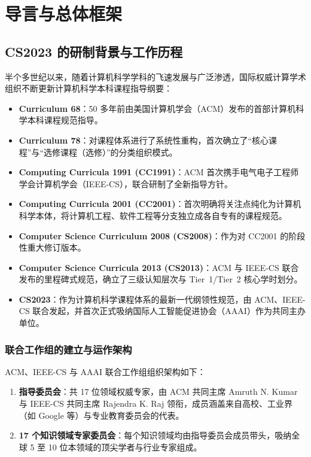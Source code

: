 \chapter{导言与总体框架}

\section{CS2023 的研制背景与工作历程}

\begin{preamblebox}[历史沿革与演进]
半个多世纪以来，随着计算机科学学科的飞速发展与广泛渗透，国际权威计算学术组织不断更新计算机科学本科课程指导纲要：
\begin{itemize}
    \item \textbf{Curriculum 68}：50 多年前由美国计算机学会（ACM）发布的首部计算机科学本科课程规范指导。
    \item \textbf{Curriculum 78}：对课程体系进行了系统性重构，首次确立了“核心课程”与“选修课程（选修）”的分类组织模式。
    \item \textbf{Computing Curricula 1991 (CC1991)}：ACM 首次携手电气电子工程师学会计算机学会（IEEE-CS），联合研制了全新指导方针。
    \item \textbf{Computing Curricula 2001 (CC2001)}：首次明确将关注点纯化为计算机科学本体，将计算机工程、软件工程等分支独立成各自专有的课程规范。
    \item \textbf{Computer Science Curriculum 2008 (CS2008)}：作为对 CC2001 的阶段性重大修订版本。
    \item \textbf{Computer Science Curricula 2013 (CS2013)}：ACM 与 IEEE-CS 联合发布的里程碑式规范，确立了三级认知层次与 Tier~1/Tier~2 核心学时划分。
    \item \textbf{CS2023}：作为计算机科学课程体系的最新一代纲领性规范，由 ACM、IEEE-CS 联合发起，并首次正式吸纳国际人工智能促进协会（AAAI）作为共同主办单位。
\end{itemize}
\end{preamblebox}

\subsection{联合工作组的建立与运作架构}
ACM、IEEE-CS 与 AAAI 联合工作组组织架构如下：
\begin{enumerate}
    \item \textbf{指导委员会}：共 17 位领域权威专家，由 ACM 共同主席 Amruth N. Kumar 与 IEEE-CS 共同主席 Rajendra K. Raj 领衔，成员涵盖来自高校、工业界（如 Google 等）与专业教育委员会的代表。
    \item \textbf{17 个知识领域专家委员会}：每个知识领域均由指导委员会成员带头，吸纳全球 5 至 10 位本领域的顶尖学者与行业专家组成。
\end{enumerate}

